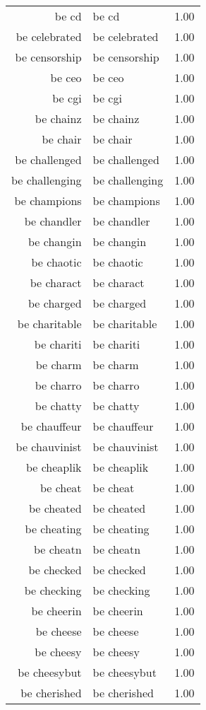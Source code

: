 \begin{table}[ht]
\begin{tabular}{rlr}
  be cd & be cd & 1.00 \\ 
  be celebrated & be celebrated & 1.00 \\ 
  be censorship & be censorship & 1.00 \\ 
  be ceo & be ceo & 1.00 \\ 
  be cgi & be cgi & 1.00 \\ 
  be chainz & be chainz & 1.00 \\ 
  be chair & be chair & 1.00 \\ 
  be challenged & be challenged & 1.00 \\ 
  be challenging & be challenging & 1.00 \\ 
  be champions & be champions & 1.00 \\ 
  be chandler & be chandler & 1.00 \\ 
  be changin & be changin & 1.00 \\ 
  be chaotic & be chaotic & 1.00 \\ 
  be charact & be charact & 1.00 \\ 
  be charged & be charged & 1.00 \\ 
  be charitable & be charitable & 1.00 \\ 
  be chariti & be chariti & 1.00 \\ 
  be charm & be charm & 1.00 \\ 
  be charro & be charro & 1.00 \\ 
  be chatty & be chatty & 1.00 \\ 
  be chauffeur & be chauffeur & 1.00 \\ 
  be chauvinist & be chauvinist & 1.00 \\ 
  be cheaplik & be cheaplik & 1.00 \\ 
  be cheat & be cheat & 1.00 \\ 
  be cheated & be cheated & 1.00 \\ 
  be cheating & be cheating & 1.00 \\ 
  be cheatn & be cheatn & 1.00 \\ 
  be checked & be checked & 1.00 \\ 
  be checking & be checking & 1.00 \\ 
  be cheerin & be cheerin & 1.00 \\ 
  be cheese & be cheese & 1.00 \\ 
  be cheesy & be cheesy & 1.00 \\ 
  be cheesybut & be cheesybut & 1.00 \\ 
  be cherished & be cherished & 1.00 \\ 

\end{tabular}
\end{table}
